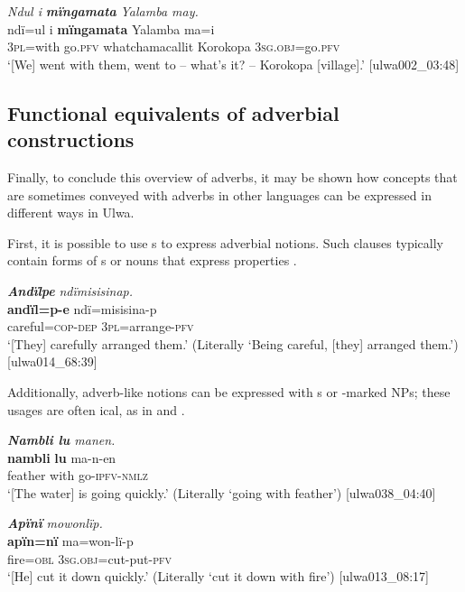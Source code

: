 \ea%
    \label{ex:otherwc:143}
          \textit{Ndul i} \textbf{\textit{mïngamata}} \textit{Yalamba may.}\\
\gll    ndï=ul    i    \textbf{mïngamata}    Yalamba  ma=i\\
    3\textsc{pl}=with  go.\textsc{pfv}  whatchamacallit  Korokopa  3\textsc{sg.obj}=go.\textsc{pfv}\\
\glt `[We] went with them, went to -- what’s it? -- Korokopa [village].’ [ulwa002\_03:48]
\z

\subsection{Functional equivalents of adverbial constructions}\label{sec:8.2.6}


Finally, to conclude this overview of adverbs, it may be shown how concepts that are sometimes conveyed with adverbs in other languages can be expressed in different ways in Ulwa.

  First, it is possible to use s to express adverbial notions. Such clauses typically contain  forms of s or nouns that express properties .

\ea%
    \label{ex:otherwc:144}
          \textbf{\textit{Andïlpe}} \textit{ndïmisisinap.}\\
\gll    \textbf{andïl=p-e}      ndï=misisina-p\\
    careful=\textsc{cop-dep}  3\textsc{pl}=arrange-\textsc{pfv}\\
\glt `[They] carefully arranged them.’ (Literally ‘Being careful, [they] arranged them.’) [ulwa014\_68:39]
\z

Additionally, adverb-like notions can be expressed with s or -marked NPs; these usages are often ical, as in  and .

\ea%
    \label{ex:otherwc:145}
          \textit{\textbf{Nambli lu} manen.}\\
\gll    \textbf{nambli}  \textbf{lu}    ma-n-en\\
    feather    with  go-\textsc{ipfv-nmlz}\\
\glt `[The water] is going quickly.’ (Literally ‘going with feather’) [ulwa038\_04:40]
\z

\ea%
    \label{ex:otherwc:146}
          \textbf{\textit{Apïnï}} \textit{mowonlïp.}\\
\gll    \textbf{apïn=nï}  ma=won-lï-p\\
    fire=\textsc{obl}  3\textsc{sg.obj}=cut-put-\textsc{pfv}\\
\glt `[He] cut it down quickly.’ (Literally ‘cut it down with fire’) [ulwa013\_08:17]
\z

